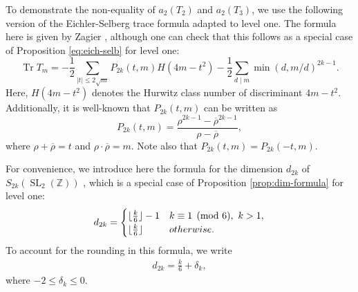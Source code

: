 \documentclass[11pt,letterpaper,reqno]{amsart}
\numberwithin{figure}{section}
\numberwithin{table}{section}
\theoremstyle{definition}
\theoremstyle{plain}
\newcommand{\ZZ}{\mathbb{Z}}
\theoremstyle{definition}
\theoremstyle{definition}
\theoremstyle{remark}
\numberwithin{equation}{section}
\DeclareMathOperator{\SL}{SL}
\DeclareMathOperator{\Tr}{Tr}
\begin{document}
To demonstrate the non-equality of $a_2(T_2)$ and $a_2(T_3)$, we use the following version of the Eichler-Selberg trace formula adapted to level one. The formula here is given by Zagier \cite[Theorem 2]{Eichler-Selber-trace-formula}, although one can check that this follows as a special case of Proposition \ref{eq:eich-selb} for level one:
\begin{equation}
     \Tr T_m=-\frac{1}{2}\sum_{|t|\leq2\sqrt{m}}P_{2k}(t,m)H(4m-t^2)-\frac{1}{2}\sum_{d \mid m}\min(d,m/d)^{2k-1}.\label{LevelOneTrace}
\end{equation}
Here, $H(4m - t^2)$ denotes the Hurwitz class number of discriminant $4m - t^2$. 
Additionally, it is well-known \cite[Theorem 2]{Eichler-Selber-trace-formula} that $P_{2k}(t, m)$ can be written as
\begin{equation} \label{eqn:P2k-formula-rho}
     P_{2k}(t,m)=\frac{\rho^{2k-1}-\overline{\rho}^{2k-1}}{\rho-\overline{\rho}},
\end{equation}
where $\rho+\overline{\rho}=t$ and $\rho\cdot\overline{\rho}=m$. Note also that $P_{2k}(t,m)=P_{2k}(-t,m)$.

For convenience, we introduce here the formula for the dimension $d_{2k}$ of $S_{2k}(\SL_2(\ZZ))$ \cite[p.~88]{diamond2005first}, which is a special case of Proposition \ref{prop:dim-formula} for level one:
\begin{align}\label{eq:dimLevelone}
    d_{2k}=\begin{cases}
        \lfloor \frac{k}{6}\rfloor -1 &k\equiv1\pmod6,\ k > 1,\\ \lfloor \frac{k}{6}\rfloor &{\rm otherwise}.
    \end{cases}
\end{align}
To account for the rounding in this formula, we write
\begin{align}
    d_{2k} = \frac{k}{6} + \delta_k, \label{eq:dim1-correction}
\end{align}
where $-2 \le \delta_k \le 0$.
\end{document}

